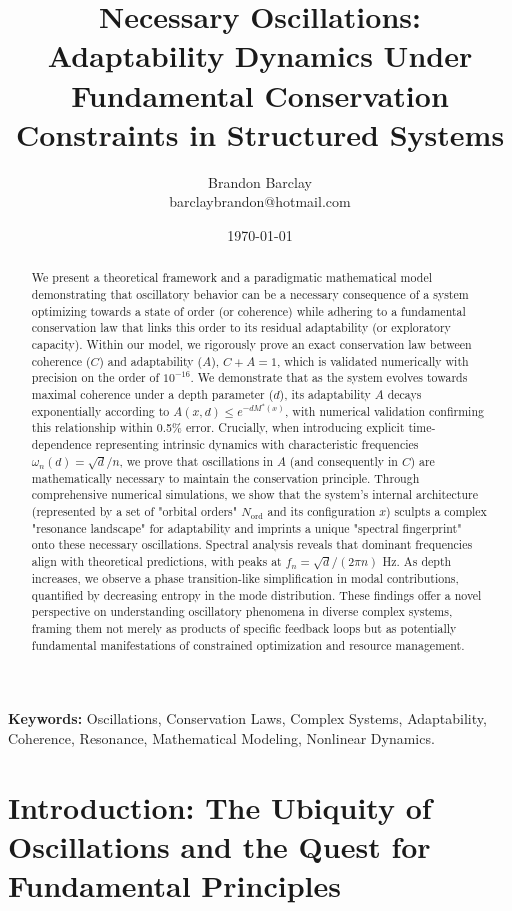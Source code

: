 \documentclass[11pt,a4paper]{article}
\title{\LARGE\bf Necessary Oscillations: Adaptability Dynamics Under Fundamental Conservation Constraints in Structured Systems}
\author{Brandon Barclay\\
\normalsize{barclaybrandon@hotmail.com}}
\date{\today}
\begin{document}
\maketitle

\begin{abstract}
We present a theoretical framework and a paradigmatic mathematical model demonstrating that oscillatory behavior can be a necessary consequence of a system optimizing towards a state of order (or coherence) while adhering to a fundamental conservation law that links this order to its residual adaptability (or exploratory capacity). Within our model, we rigorously prove an exact conservation law between coherence ($C$) and adaptability ($A$), $C+A=1$, which is validated numerically with precision on the order of $10^{-16}$. We demonstrate that as the system evolves towards maximal coherence under a depth parameter ($d$), its adaptability $A$ decays exponentially according to $A(x,d) \leq e^{-d M^*(x)}$, with numerical validation confirming this relationship within 0.5\% error. Crucially, when introducing explicit time-dependence representing intrinsic dynamics with characteristic frequencies $\omega_n(d) = \sqrt{d}/n$, we prove that oscillations in $A$ (and consequently in $C$) are mathematically necessary to maintain the conservation principle. Through comprehensive numerical simulations, we show that the system's internal architecture (represented by a set of "orbital orders" $N_{\text{ord}}$ and its configuration $x$) sculpts a complex "resonance landscape" for adaptability and imprints a unique "spectral fingerprint" onto these necessary oscillations. Spectral analysis reveals that dominant frequencies align with theoretical predictions, with peaks at $f_n = \sqrt{d}/(2\pi n)$ Hz. As depth increases, we observe a phase transition-like simplification in modal contributions, quantified by decreasing entropy in the mode distribution. These findings offer a novel perspective on understanding oscillatory phenomena in diverse complex systems, framing them not merely as products of specific feedback loops but as potentially fundamental manifestations of constrained optimization and resource management.
\end{abstract}

\textbf{Keywords:} Oscillations, Conservation Laws, Complex Systems, Adaptability, Coherence, Resonance, Mathematical Modeling, Nonlinear Dynamics.

\section{Introduction: The Ubiquity of Oscillations and the Quest for Fundamental Principles}
\end{document}
